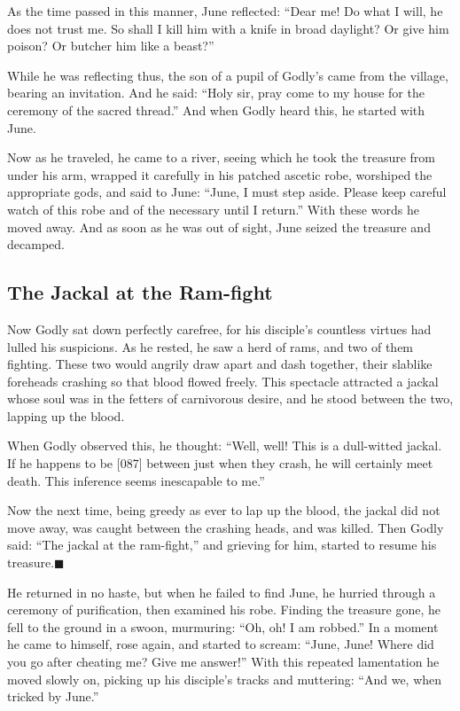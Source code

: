 \documentclass[article, twoside, 14pt]{memoir}
\newcommand{\qed}{\hfill \ensuremath{\blacksquare}}
\begin{document}
As the time passed in this manner, June reflected:
``Dear me! Do what I will, he does not trust me. So shall I kill him with a knife in broad daylight? Or give him poison? Or butcher him like a beast?''

While he was reflecting thus, the son of a pupil of Godly's came
from the village, bearing an invitation. And he said:
``Holy sir, pray come to my house for the ceremony of the sacred thread.''
And when Godly heard this, he started with June.

Now as he traveled, he came to a river, seeing which he took the
treasure from under his arm, wrapped it carefully in his patched
ascetic robe, worshiped the appropriate gods, and said to June:
``June, I must step aside. Please keep careful watch of this robe and of the necessary until I return.''
With these words he moved away. And as soon as he was out of sight,
June seized the treasure and decamped.

\subsection{The Jackal at the Ram-fight}

\label{s6}

Now Godly sat down perfectly carefree, for his disciple's countless
virtues had lulled his suspicions. As he rested, he saw a herd of
rams, and two of them fighting. These two would angrily draw apart
and dash together, their slablike foreheads crashing so that blood
flowed freely. This spectacle attracted a jackal whose soul was in
the fetters of carnivorous desire, and he stood between the two,
lapping up the blood.

When Godly observed this, he thought:
``Well, well! This is a dull-witted jackal. If he happens to be [087] between just when they crash, he will certainly meet death. This inference seems inescapable to me.''

Now the next time, being greedy as ever to lap up the blood, the
jackal did not move away, was caught between the crashing heads,
and was killed. Then Godly said: ``The jackal at the ram-fight,''
and grieving for him, started to resume his
treasure.\hyperref[s6]{\qed}

He returned in no haste, but when he failed to find June, he
hurried through a ceremony of purification, then examined his robe.
Finding the treasure gone, he fell to the ground in a swoon,
murmuring: ``Oh, oh! I am robbed.'' In a moment he came to himself,
rose again, and started to scream:
``June, June! Where did you go after cheating me? Give me answer!''
With this repeated lamentation he moved slowly on, picking up his
disciple's tracks and muttering: ``And we, when tricked by June.''
\end{document}
